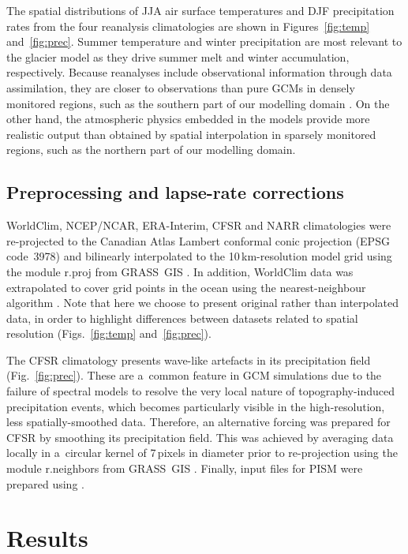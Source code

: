 \documentclass[tc, ms]{copernicus}
\begin{document}
The spatial distributions of JJA air surface temperatures and DJF precipitation rates from the four reanalysis climatologies are shown in Figures~\ref{fig:temp} and~\ref{fig:prec}. Summer temperature and winter precipitation are most relevant to the glacier model as they drive summer melt and winter accumulation, respectively. Because reanalyses include observational information through data assimilation, they are closer to observations than pure GCMs in densely monitored regions, such as the southern part of our modelling domain \citep{bengtsson-etal-2007}. On the other hand, the atmospheric physics embedded in the models provide more realistic output than obtained by spatial interpolation in sparsely monitored regions, such as the northern part of our modelling domain.

\subsection{Preprocessing and lapse-rate corrections}

WorldClim, NCEP/NCAR, ERA-Interim, CFSR and NARR climatologies were re-projected to the Canadian Atlas Lambert conformal conic projection (EPSG code~3978) and bilinearly interpolated to the 10\,km-resolution model grid using the module r.proj from GRASS~GIS \citep{soft:grass}. In addition, WorldClim data was extrapolated to cover grid points in the ocean using the nearest-neighbour algorithm \citep{soft:scipy}. Note that here we choose to present original rather than interpolated data, in order to highlight differences between datasets related to spatial resolution (Figs.~\ref{fig:temp} and~\ref{fig:prec}).

The CFSR climatology presents wave-like artefacts in its precipitation field (Fig.~\ref{fig:prec}). These are a~common feature in GCM simulations due to the failure of spectral models to resolve the very local nature of topography-induced precipitation events, which becomes particularly visible in the high-resolution, less spatially-smoothed data. Therefore, an alternative forcing was prepared for CFSR by smoothing its precipitation field. This was achieved by averaging data locally in a~circular kernel of 7\,pixels in diameter prior to re-projection using the module r.neighbors from GRASS~GIS \citep{soft:grass}. Finally, input files for PISM were prepared using \citet{web:nc4py}.

\section{Results}
\label{sec:results}
\end{document}
